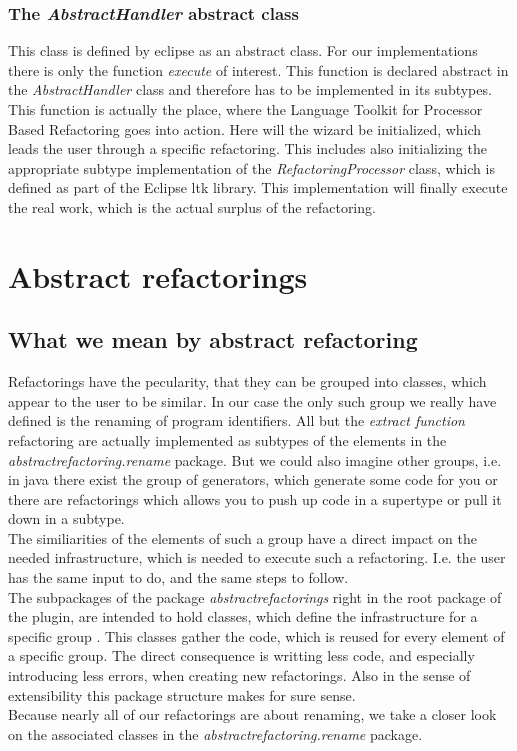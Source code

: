 \documentclass[a4paper,10pt]{report}
\begin{document}
\subsection{The {\it AbstractHandler} abstract class}
This class is defined by eclipse as an abstract class. For our implementations there is only the function {\it execute} of interest. This function is declared abstract in the {\it AbstractHandler} class and therefore has to be implemented in its subtypes.\\
This function is actually the place, where the Language Toolkit for Processor Based Refactoring goes into action. Here will the wizard be initialized, which leads the user through a specific refactoring. This includes also initializing the appropriate subtype implementation of the {\it RefactoringProcessor} class, which is defined as part of the Eclipse ltk library. 
This implementation will finally execute the real work, which is the actual surplus of the refactoring.

\chapter{Abstract refactorings}
\label{abstractRefactorings}
\section{What we mean by abstract refactoring}
Refactorings have the pecularity, that they can be grouped into classes, which appear to the user to be similar. In our case the only such group we really have defined is the renaming of program identifiers. All but the {\it extract function} refactoring are actually implemented as subtypes of the elements in the {\it abstractrefactoring.rename} package.
But we could also imagine other groups, i.e. in java there exist the group of generators, which generate some code for you or there are refactorings which allows you to push up code in a supertype or pull it down in a subtype.\\
The similiarities of the elements of such a group have a direct impact on the needed infrastructure, which is needed to execute such a refactoring. I.e. the user has the same input to do, and the same steps to follow.\\
The subpackages of the package {\it abstractrefactorings} right in the root package of the plugin, are intended to hold classes, which define the infrastructure for a specific group . This classes gather the code, which is reused for every element of a specific group. The direct consequence is writting less code, and especially introducing less errors, when creating new refactorings. Also in the sense of extensibility this package structure makes for sure sense.\\
Because nearly all of our refactorings are about renaming, we take a closer look on the associated classes in the {\it abstractrefactoring.rename} package.
\end{document}

